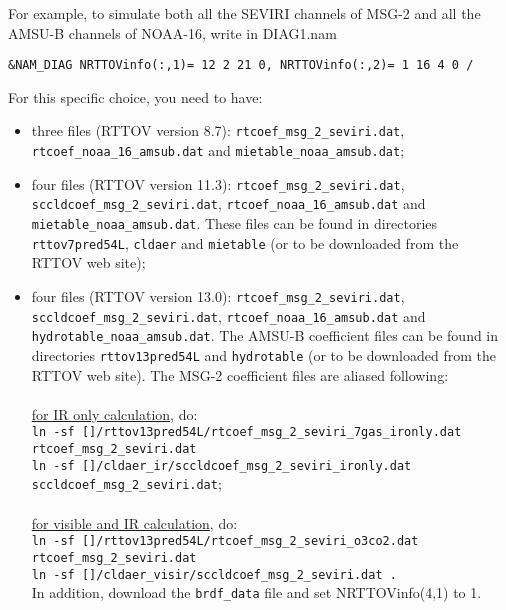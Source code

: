 For example, to simulate both all the SEVIRI channels of MSG-2 and all the AMSU-B channels of NOAA-16, write in DIAG1.nam
\begin{verbatim}
&NAM_DIAG NRTTOVinfo(:,1)= 12 2 21 0, NRTTOVinfo(:,2)= 1 16 4 0 /
\end{verbatim}
For this specific choice, you need to have:
\begin{itemize}
\item{three files (RTTOV version 8.7)}:
{\tt rtcoef\_msg\_2\_seviri.dat}, {\tt rtcoef\_noaa\_16\_amsub.dat} and {\tt mietable\_noaa\_amsub.dat};
\item{four files (RTTOV version 11.3)}:
{\tt rtcoef\_msg\_2\_seviri.dat}, {\tt sccldcoef\_msg\_2\_seviri.dat}, {\tt rtcoef\_noaa\_16\_amsub.dat} and {\tt mietable\_noaa\_amsub.dat}. These files can be found in directories {\tt rttov7pred54L}, {\tt cldaer} and {\tt mietable} (or to be downloaded from the RTTOV web site);
\item{four files (RTTOV version 13.0)}:
{\tt rtcoef\_msg\_2\_seviri.dat}, {\tt sccldcoef\_msg\_2\_seviri.dat}, {\tt rtcoef\_noaa\_16\_amsub.dat} and {\tt hydrotable\_noaa\_amsub.dat}. The AMSU-B coefficient files can be found in directories {\tt rttov13pred54L} and {\tt hydrotable} (or to be downloaded from the RTTOV web site). The MSG-2 coefficient files are aliased following:\\
~\\
\underline{for IR only calculation}, do:\\
{\tt ln -sf []/rttov13pred54L/rtcoef\_msg\_2\_seviri\_7gas\_ironly.dat rtcoef\_msg\_2\_seviri.dat}\\
{\tt ln -sf []/cldaer\_ir/sccldcoef\_msg\_2\_seviri\_ironly.dat sccldcoef\_msg\_2\_seviri.dat};\\
~\\
\underline{for visible and IR calculation}, do:\\
{\tt ln -sf []/rttov13pred54L/rtcoef\_msg\_2\_seviri\_o3co2.dat rtcoef\_msg\_2\_seviri.dat}\\
{\tt ln -sf []/cldaer\_visir/sccldcoef\_msg\_2\_seviri.dat .}\\
In addition, download the {\tt brdf\_data} file and set NRTTOVinfo(4,1) to 1.
\end{itemize}

